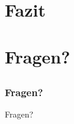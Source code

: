 \documentclass{beamer}
\begin{document}
\section{Fazit}
\subsection*{}

\section{Fragen?}
\subsection*{}

\begin{frame}
	\frametitle{Fragen?}
	\begin{center}
		\large Fragen?
	\end{center}
\end{frame}
\end{document}
